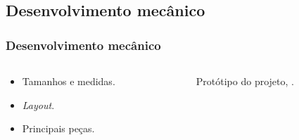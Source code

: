 \documentclass[hyperref={colorlinks=true,    
allcolors = blue,citecolor=blue}]{beamer} %
\begin{document}
\begin{frame}
\subsection{Desenvolvimento mecânico}
\frametitle{Desenvolvimento mecânico}


\begin{columns}
    \begin{column}{0.47\textwidth}
        \begin{itemize}
            \item Tamanhos e medidas.
            \item \textit{Layout}.
            \item Principais peças.
        \end{itemize}
    \end{column}
    \begin{column}{0.5\textwidth}
        \begin{figure}
            \centering            
        \caption{Protótipo do projeto, \cite{tinkercad}.}
        \label{fig:enter-label}
        \end{figure}
    \end{column}
\end{columns}


\end{frame}
\end{document}
